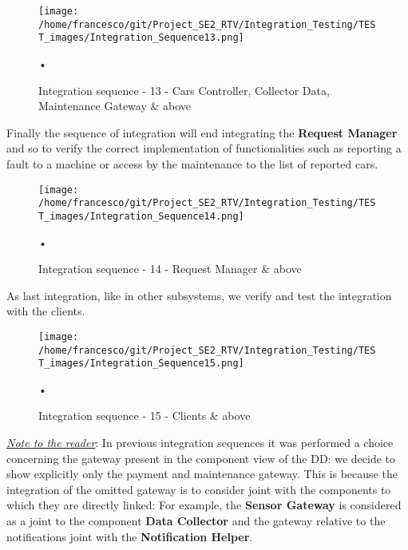 \documentclass[10pt, a4paper,titlepage]{article}
\begin{document}
\begin{figure}[h]
\begin{center}
\texttt{[image: /home/francesco/git/Project\_SE2\_RTV/Integration\_Testing/TEST\_images/Integration\_Sequence13.png]}
\caption{Integration sequence - 13 - Cars Controller, Collector Data, Maintenance Gateway \& above}
\label{fig:int_seq13}
\end{center}•
\end{figure}
Finally the sequence of integration will end integrating the \textbf{Request Manager} and so to verify the correct implementation of functionalities such as reporting a fault to a machine or access by the maintenance to the list of reported cars.
\begin{figure}[h]
\begin{center}
\texttt{[image: /home/francesco/git/Project\_SE2\_RTV/Integration\_Testing/TEST\_images/Integration\_Sequence14.png]}
\caption{Integration sequence - 14 - Request Manager \& above}
\label{fig:int_seq14}
\end{center}•
\end{figure}
As last integration, like in other subsystems, we verify and test the integration with the clients.
\begin{figure}[h]
\begin{center}
\texttt{[image: /home/francesco/git/Project\_SE2\_RTV/Integration\_Testing/TEST\_images/Integration\_Sequence15.png]}
\caption{Integration sequence - 15 - Clients \& above}
\label{fig:int_seq15}
\end{center}•
\end{figure}
\clearpage
\emph{\underline{Note to the reader}}: In previous integration sequences it was performed a choice concerning the gateway present in the component view of the DD: we decide to show explicitly only the payment and maintenance gateway. This is because the integration of the omitted gateway is to consider joint with the components to which they are directly linked: For example, the \textbf{Sensor Gateway} is considered as a joint to the component \textbf{Data Collector} and the gateway relative to the notifications joint with the \textbf{Notification Helper}.
\pagebreak
\end{document}
